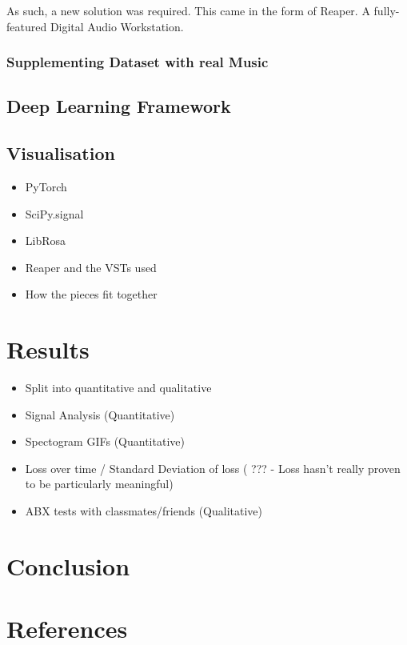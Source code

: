 \documentclass{l4proj}
\providecommand{\tightlist}{%
  \setlength{\itemsep}{0pt}\setlength{\parskip}{0pt}}
\begin{document}
As such, a new solution was required. This came in the form of Reaper. A
fully-featured Digital Audio Workstation.

\hypertarget{supplementing-dataset-with-real-music}{%
\subsection{Supplementing Dataset with real
Music}\label{supplementing-dataset-with-real-music}}

\hypertarget{deep-learning-framework}{%
\section{Deep Learning Framework}\label{deep-learning-framework}}

\hypertarget{visualisation}{%
\section{Visualisation}\label{visualisation}}

\begin{itemize}
\tightlist
\item
  PyTorch
\item
  SciPy.signal
\item
  LibRosa
\item
  Reaper and the VSTs used
\item
  How the pieces fit together
\end{itemize}

\hypertarget{results}{%
\chapter{Results}\label{results}}

\begin{itemize}
\tightlist
\item
  Split into quantitative and qualitative
\item
  Signal Analysis (Quantitative)
\item
  Spectogram GIFs (Quantitative)
\item
  Loss over time / Standard Deviation of loss ( ??? - Loss hasn't really
  proven to be particularly meaningful)
\item
  ABX tests with classmates/friends (Qualitative)
\end{itemize}

\hypertarget{conclusion}{%
\chapter{Conclusion}\label{conclusion}}

\hypertarget{references}{%
\chapter{References}\label{references}}
\end{document}

